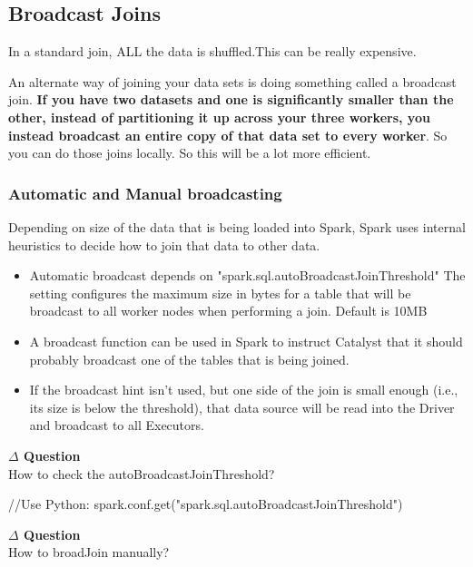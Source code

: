 \documentclass[12pt]{article}
\newenvironment{que}
    { \begin{mdframed}[backgroundcolor=green!20] \textbf{$\Delta$ Question} \\}
    {  \end{mdframed}}
\begin{document}
\subsection{Broadcast Joins}
In a standard join, ALL the data is shuffled.This can be really expensive.

An alternate way of joining your data sets is doing something called a broadcast join. \textbf{If you have two datasets and one is significantly smaller than the other,
instead of partitioning it up across your three workers, you instead broadcast an entire copy of that data set to every worker}. So you can do those joins locally.
So this will be a lot more efficient. 
\subsubsection{Automatic and Manual broadcasting}
Depending on size of the data that is being loaded into Spark, Spark uses internal heuristics to decide how to join that data to other data.
\begin{itemize}
    \item Automatic broadcast depends on "spark.sql.autoBroadcastJoinThreshold" The setting configures the maximum size in bytes for a table that will be broadcast to all worker nodes when performing a join. Default is 10MB
    \item A broadcast function can be used in Spark to instruct Catalyst that it should probably broadcast one of the tables that is being joined.
    \item If the broadcast hint isn't used, but one side of the join is small enough (i.e., its size is below the threshold), that data source will be read into the Driver and broadcast to all Executors.
\end{itemize}
\begin{que}
How to check the autoBroadcastJoinThreshold?
\end{que}
\begin{code}
//Use Python:
spark.conf.get("spark.sql.autoBroadcastJoinThreshold")
\end{code}
\begin{que}
How to broadJoin manually?
\end{que}
\end{document}
